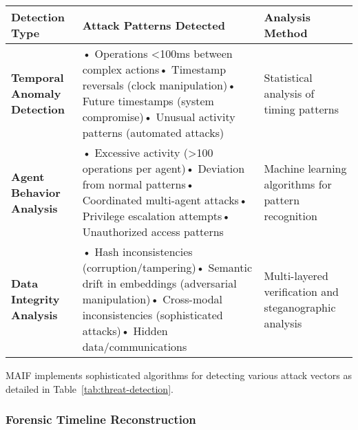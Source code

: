 \documentclass[conference]{IEEEtran}
\begin{document}
\begin{table*}[!t]
\renewcommand{\arraystretch}{1.3}
\caption{MAIF Automated Threat Detection Mechanisms}
\label{tab:threat-detection}
\centering
\footnotesize
\begin{tabular}{p{3.5cm}p{5.5cm}p{5cm}}
\toprule
\textbf{Detection Type} & \textbf{Attack Patterns Detected} & \textbf{Analysis Method} \\
\midrule
\textbf{Temporal Anomaly Detection} & • Operations <100ms between complex actions\newline • Timestamp reversals (clock manipulation)\newline • Future timestamps (system compromise)\newline • Unusual activity patterns (automated attacks) & Statistical analysis of timing patterns \\
\textbf{Agent Behavior Analysis} & • Excessive activity (>100 operations per agent)\newline • Deviation from normal patterns\newline • Coordinated multi-agent attacks\newline • Privilege escalation attempts\newline • Unauthorized access patterns & Machine learning algorithms for pattern recognition \\
\textbf{Data Integrity Analysis} & • Hash inconsistencies (corruption/tampering)\newline • Semantic drift in embeddings (adversarial manipulation)\newline • Cross-modal inconsistencies (sophisticated attacks)\newline • Hidden data/communications & Multi-layered verification and steganographic analysis \\
\bottomrule
\end{tabular}
\end{table*}

MAIF implements sophisticated algorithms for detecting various attack vectors as detailed in Table~\ref{tab:threat-detection}.

\subsubsection{Forensic Timeline Reconstruction}
\end{document}
